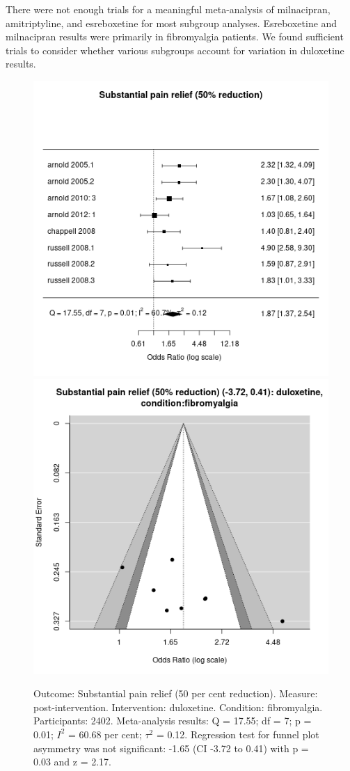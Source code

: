 \documentclass{report}\usepackage[]{graphicx}\usepackage[]{color}
\newenvironment{knitrout}{}{} %
\begin{document}
There were not enough trials for a meaningful meta-analysis of milnacipran, amitriptyline, and esreboxetine for most subgroup analyses. Esreboxetine and milnacipran results were primarily in fibromyalgia patients. We found sufficient trials to consider whether various subgroups account for variation in duloxetine results.


\begin{figure}

\begin{knitrout}
\color{fgcolor}
\includegraphics[width=0.5\linewidth,height=0.35\textheight]{img/pain_sub-duloxetine-condition-fibromyalgia-forest} 
\includegraphics[width=0.5\linewidth,height=0.35\textheight]{img/pain_sub-duloxetine-condition-fibromyalgia-funnel} 
\end{knitrout}

\caption[Substantial pain: duloxetine, fibromyalgia]{Outcome: Substantial pain relief  (50 per cent reduction). Measure: post-intervention. Intervention: duloxetine. Condition: fibromyalgia. Participants: 2402. Meta-analysis results: Q = 17.55; df = 7; p = 0.01; $I^2$ = 60.68 per cent; $\tau^2$ = 0.12. Regression test for funnel plot asymmetry was not significant: -1.65 (CI -3.72 to 0.41) with p = 0.03 and z = 2.17.
}
\label{fig:subpain-fibro-dulox}
\end{figure}
\end{document}
